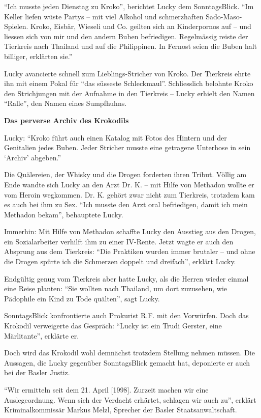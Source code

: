 ``Ich musste jeden Dienstag zu Kroko'', berichtet Lucky dem
SonntagsBlick. ``Im Keller liefen wüste Partys -- mit viel Alkohol und
schmerzhaften Sado-Maso-Spielen. Kroko, Eisbär, Wieseli und Co. geilten
sich an Kinderpornos auf -- und liessen sich von mir und den andern
Buben befriedigen. Regelmässig reiste der Tierkreis nach Thailand und
auf die Philippinen. In Fernost seien die Buben halt billiger, erklärten
sie.''

Lucky avancierte schnell zum Lieblings-Stricher von Kroko. Der Tierkreis
ehrte ihn mit einem Pokal für ``das süsseste Schleckmaul''. Schliesslich
belohnte Kroko den Strichjungen mit der Aufnahme in den Tierkreis --
Lucky erhielt den Namen ``Ralle'', den Namen eines Sumpfhuhns.

\textbf{Das perverse Archiv des Krokodils}

Lucky: ``Kroko führt auch einen Katalog mit Fotos des Hintern und der
Genitalien jedes Buben. Jeder Stricher musste eine getragene Unterhose
in sein `Archiv' abgeben.''

Die Quälereien, der Whisky und die Drogen forderten ihren Tribut. Völlig
am Ende wandte sich Lucky an den Arzt Dr. K. -- mit Hilfe von Methadon
wollte er vom Heroin wegkommen. Dr. K. gehört zwar nicht zum Tierkreis,
trotzdem kam es auch bei ihm zu Sex. ``Ich musste den Arzt oral
befriedigen, damit ich mein Methadon bekam'', behauptete Lucky.

Immerhin: Mit Hilfe von Methadon schaffte Lucky den Ausstieg aus den
Drogen, ein Sozialarbeiter verhilft ihm zu einer IV-Rente. Jetzt wagte
er auch den Absprung aus dem Tierkreis: ``Die Praktiken wurden immer
brutaler -- und ohne die Drogen spürte ich die Schmerzen doppelt und
dreifach'', erklärt Lucky.

Endgültig genug vom Tierkreis aber hatte Lucky, als die Herren wieder
einmal eine Reise planten: ``Sie wollten nach Thailand, um dort
zuzusehen, wie Pädophile ein Kind zu Tode quälten'', sagt Lucky.

SonntagsBlick konfrontierte auch Prokurist R.F. mit den Vorwürfen. Doch
das Krokodil verweigerte das Gespräch: ``Lucky ist ein Trudi Gerster,
eine Märlitante'', erklärte er.

Doch wird das Krokodil wohl demnächst trotzdem Stellung nehmen müssen.
Die Aussagen, die Lucky gegenüber SonntagsBlick gemacht hat, deponierte
er auch bei der Basler Justiz.

``Wir ermitteln seit dem 21. April {[}1998{]}. Zurzeit machen wir eine
Auslegeordnung. Wenn sich der Verdacht erhärtet, schlagen wir auch zu'',
erklärt Kriminalkommissär Markus Melzl, Sprecher der Basler
Staatsanwaltschaft.

